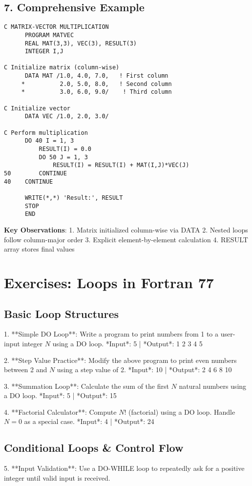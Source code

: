 \documentclass{book}
\begin{document}
\subsection*{7. Comprehensive Example}
\begin{verbatim}
C MATRIX-VECTOR MULTIPLICATION
      PROGRAM MATVEC
      REAL MAT(3,3), VEC(3), RESULT(3)
      INTEGER I,J
      
C Initialize matrix (column-wise)
      DATA MAT /1.0, 4.0, 7.0,   ! First column
     *          2.0, 5.0, 8.0,   ! Second column
     *          3.0, 6.0, 9.0/    ! Third column
     
C Initialize vector
      DATA VEC /1.0, 2.0, 3.0/

C Perform multiplication
      DO 40 I = 1, 3
          RESULT(I) = 0.0
          DO 50 J = 1, 3
              RESULT(I) = RESULT(I) + MAT(I,J)*VEC(J)
50        CONTINUE
40    CONTINUE

      WRITE(*,*) 'Result:', RESULT
      STOP
      END
\end{verbatim}

\textbf{Key Observations}:
1. Matrix initialized column-wise via DATA
2. Nested loops follow column-major order
3. Explicit element-by-element calculation
4. RESULT array stores final values

\section{Exercises: Loops in Fortran 77}

\subsection*{Basic Loop Structures}
1. **Simple DO Loop**:  
Write a program to print numbers from 1 to a user-input integer \( N \) using a DO loop.  
*Input*: 5 | *Output*: 1 2 3 4 5  

2. **Step Value Practice**:  
Modify the above program to print even numbers between 2 and \( N \) using a step value of 2.  
*Input*: 10 | *Output*: 2 4 6 8 10  

3. **Summation Loop**:  
Calculate the sum of the first \( N \) natural numbers using a DO loop.  
*Input*: 5 | *Output*: 15  

4. **Factorial Calculator**:  
Compute \( N! \) (factorial) using a DO loop. Handle \( N = 0 \) as a special case.  
*Input*: 4 | *Output*: 24  

\subsection*{Conditional Loops \& Control Flow}  
5. **Input Validation**:  
Use a DO-WHILE loop to repeatedly ask for a positive integer until valid input is received.  
\end{document}
